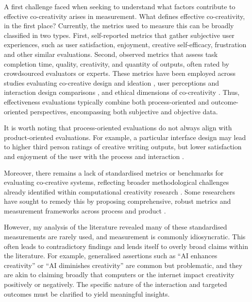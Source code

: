 A first challenge faced when seeking to understand what factors contribute to effective co-creativity arises in measurement. What defines effective co-creativity, in the first place? Currently, the metrics used to measure this can be broadly classified in two types. First, self-reported metrics that gather subjective user experiences, such as user satisfaction, enjoyment, creative self-efficacy, frustration and other similar evaluations. Second, observed metrics that assess task completion time, quality, creativity, and quantity of outputs, often rated by crowdsourced evaluators or experts. These metrics have been employed across studies evaluating co-creative design and ideation \citep{Kim2021-fh, Kantosalo2019-pz}, user perceptions and interaction design comparisons \citep{Rezwana2022-ui, Lawton2023-tb}, and ethical dimensions of co-creativity \citep{Rezwana2023-gj}. Thus, effectiveness evaluations typically combine both process-oriented and outcome-oriented perspectives, encompassing both subjective and objective data.

It is worth noting that process-oriented evaluations do not always align with product-oriented evaluations. For example, a particular interface design may lead to higher third person ratings of creative writing outputs, but lower satisfaction and enjoyment of the user with the process and interaction \citep{Lee2022-rj}. 

Moreover, there remains a lack of standardised metrics or benchmarks for evaluating co-creative systems, reflecting broader methodological challenges already identified within computational creativity research \citep{Jordanous2012-kw}. Some researchers have sought to remedy this by proposing comprehensive, robust metrics and measurement frameworks across process and product \citep{Kantosalo2019-pz, Davis2016-te, Lawton2023-gd, Lee2022-rj}. 

However, my analysis of the literature revealed many of these standardised measurements are rarely used, and measurement is commonly idiosyncratic. This often leads to contradictory findings and lends itself to overly broad claims within the literature. For example, generalised assertions such as ``AI enhances creativity'' or ``AI diminishes creativity'' are common but problematic, and they are akin to claiming broadly that computers or the internet impact creativity positively or negatively. The specific nature of the interaction and targeted outcomes must be clarified to yield meaningful insights.

